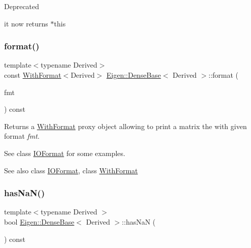 \begin{DoxyRefDesc}{Deprecated}
\item[\mbox{\hyperlink{deprecated__deprecated000005}{Deprecated}}]it now returns {\ttfamily $\ast$this} \end{DoxyRefDesc}
\mbox{\label{class_eigen_1_1_dense_base_ab231f1a6057f28d4244145e12c9fc0c7}} 
\subsubsection{\texorpdfstring{format()}{format()}}
{\footnotesize\ttfamily template$<$typename Derived$>$ \\
const \mbox{\hyperlink{class_eigen_1_1_with_format}{With\+Format}}$<$Derived$>$ \mbox{\hyperlink{class_eigen_1_1_dense_base}{Eigen\+::\+Dense\+Base}}$<$ Derived $>$\+::format (\begin{DoxyParamCaption}\item[{const \mbox{\hyperlink{struct_eigen_1_1_i_o_format}{I\+O\+Format}} \&}]{fmt }\end{DoxyParamCaption}) const\hspace{0.3cm}{\ttfamily [inline]}}

\begin{DoxyReturn}{Returns}
a \mbox{\hyperlink{class_eigen_1_1_with_format}{With\+Format}} proxy object allowing to print a matrix the with given format {\itshape fmt}.
\end{DoxyReturn}
See class \mbox{\hyperlink{struct_eigen_1_1_i_o_format}{I\+O\+Format}} for some examples.

\begin{DoxySeeAlso}{See also}
class \mbox{\hyperlink{struct_eigen_1_1_i_o_format}{I\+O\+Format}}, class \mbox{\hyperlink{class_eigen_1_1_with_format}{With\+Format}} 
\end{DoxySeeAlso}
\mbox{\label{class_eigen_1_1_dense_base_ab13d158c900560d3e1b25d85d2d33dd6}} 
\subsubsection{\texorpdfstring{hasNaN()}{hasNaN()}}
{\footnotesize\ttfamily template$<$typename Derived $>$ \\
bool \mbox{\hyperlink{class_eigen_1_1_dense_base}{Eigen\+::\+Dense\+Base}}$<$ Derived $>$\+::has\+NaN (\begin{DoxyParamCaption}{ }\end{DoxyParamCaption}) const\hspace{0.3cm}{\ttfamily [inline]}}

